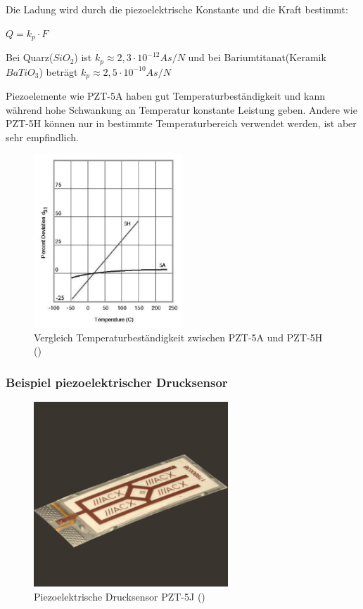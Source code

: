 \documentclass[12pt]{article}
\begin{document}
Die Ladung wird durch die piezoelektrische Konstante und die Kraft bestimmt: 
\begin{center}
  $Q = k_{p} \cdot F$
\end{center}
Bei Quarz($SiO_2$) ist $k_p \approx 2,3 \cdot 10^{-12} As/N$ und bei Bariumtitanat(Keramik $BaTiO_3$) beträgt $k_p \approx 2,5 \cdot 10^{-10} As/N $

Piezoelemente wie PZT-5A haben gut Temperaturbeständigkeit und kann während hohe Schwankung an Temperatur konstante Leistung geben. Andere wie PZT-5H können nur in bestimmte Temperaturbereich verwendet werden, ist aber sehr empfindlich.

\begin{figure}[h!]
  \centering
  \label{fig:5h5a}
  \includegraphics[width=0.5\textwidth]{5h5a}
  \caption{Vergleich Temperaturbeständigkeit zwischen PZT-5A und PZT-5H (\cite{PIEZO.COM.2021})}
\end{figure}

\subsubsection{Beispiel piezoelektrischer Drucksensor}

\begin{figure}[h!]
  \centering
  \label{fig:piezoelektrischedrucksensor}
  \includegraphics[width=0.65\textwidth]{piezoelektrischedrucksensor}
  \caption{Piezoelektrische Drucksensor PZT-5J (\cite{PIEZO.COM.2021})}
\end{figure}
\end{document}
